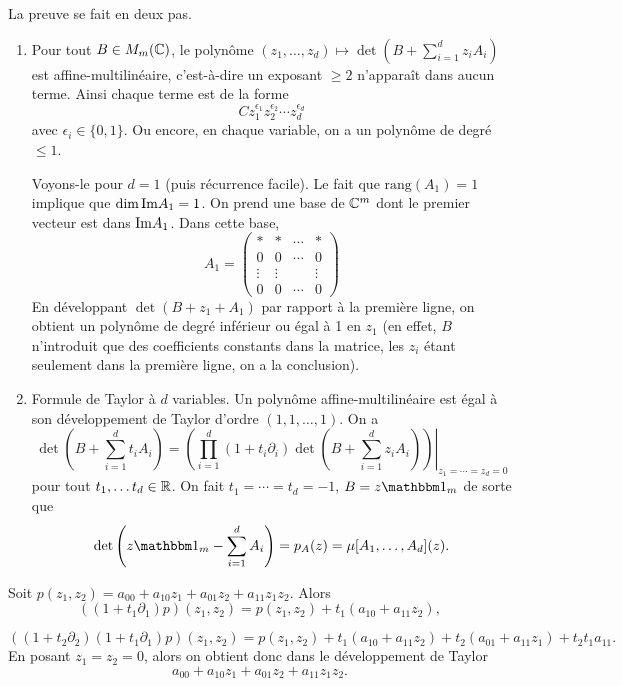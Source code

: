 \begin{preuve}
  La preuve se fait en deux pas.
  \begin{enumerate}
  \item Pour tout $B \in M_m(\mathbb{C})$, le polynôme $(z_1, \ldots, z_d) \mapsto \det \left( B + \sum_{i = 1}^{d}
      z_i A_i \right)$ est affine-multilinéaire, c'est-à-dire un exposant $\geq 2$ n'apparaît dans aucun
    terme. Ainsi chaque terme est de la forme 
    \[ C z_1^{\epsilon_1} z_2^{\epsilon_2} \cdots z_d^{\epsilon_d} \]
    avec $\epsilon_i \in \{0,1\}$. Ou encore, en chaque variable, on a un polynôme de degré $\leq 1$.

    Voyons-le pour $d = 1$ (puis récurrence facile). Le fait que $\mathrm{rang}(A_1) = 1$ implique que $\dim
    \mathrm{Im} A_1 = 1$. On prend une base de $\mathbb{C}^m$ dont le premier vecteur est dans $\mathrm{Im} A_1$. Dans cette base, 
    \[ A_1 =
      \begin{pmatrix}
        \ast & \ast & \cdots & \ast\\
        0 & 0 & \cdots & 0\\
        \vdots & \vdots & & \vdots\\
        0 & 0 & \cdots & 0
      \end{pmatrix}
    \]
    En développant $\det(B + z_1 + A_1)$ par rapport à la première ligne, on obtient un polynôme de degré
    inférieur ou égal à 1 en $z_1$ (en effet, $B$ n'introduit que des coefficients constants dans la matrice,
    les $z_i$ étant seulement dans la première ligne, on a la conclusion).

    
  \item Formule de Taylor à $d$ variables. Un polynôme affine-multilinéaire est égal à son développement de
    Taylor d'ordre $(1, 1, \ldots, 1)$. On a
    \[ \det \left( B + \sum_{i=1}^{d}t_i A_i \right) =  \left. \left(\prod_{i=1}^d \left(1 + t_i \partial_i\right) \det
          \left( B + \sum_{i = 1}^{d} z_i A_i \right)\right) \right |_{z_1 = \cdots = z_d = 0}\]
    pour tout $t_1, \ldots t_d \in \mathbb{R}$. On fait $t_1 = \cdots = t_d = -1$, $B = z \un_m$ de sorte que 
    \[ \det \left( z \un_m - \sum_{i = 1}^{d} A_i \right) = p_A(z) = \mu[A_1, \ldots, A_d](z). \]
  \end{enumerate}
\end{preuve}


\begin{ex}
  Soit $p(z_1, z_2) = a_{00} + a_{10} z_1 + a_{01} z_2 + a_{11}z_1 z_2$. Alors 
  \[ \left( (1 + t_1 \partial_1)p \right)(z_1,z_2) = p(z_1, z_2) + t_1(a_{10} + a_{11}z_2), \]
  
  \[ \left( (1 + t_2 \partial_2)(1 + t_1 \partial_1)p \right)(z_1, z_2) = p(z_1, z_2) + t_1(a_{10} +
    a_{11}z_2) + t_2(a_{01} + a_{11}z_1) + t_2t_1a_{11}. \]
  En posant $z_1 = z_2 = 0$, alors on obtient donc dans le développement de Taylor 
  \[ a_{00} + a_{10} z_1 + a_{01} z_2 + a_{11}z_1 z_2. \]
\end{ex}


